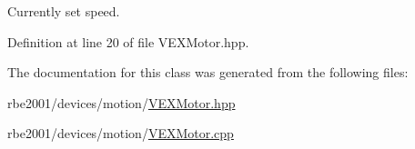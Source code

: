 Currently set speed. 



Definition at line 20 of file V\+E\+X\+Motor.\+hpp.



The documentation for this class was generated from the following files\+:\begin{DoxyCompactItemize}
\item 
rbe2001/devices/motion/\hyperlink{_v_e_x_motor_8hpp}{V\+E\+X\+Motor.\+hpp}\item 
rbe2001/devices/motion/\hyperlink{_v_e_x_motor_8cpp}{V\+E\+X\+Motor.\+cpp}\end{DoxyCompactItemize}
